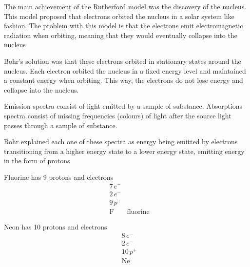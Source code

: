 \begin{solutions}
    \item The main achievement of the Rutherford model was the discovery of the nucleus. This
        model proposed that electrons orbited the nucleus in a solar system like fashion. The
        problem with this model is that the electrons emit electromagnetic radiation when orbiting,
        meaning that they would eventually collapse into the nucleus
    \item Bohr's solution was that these electrons orbited in stationary states around the nucleus.
        Each electron orbited the nucleus in a fixed energy level and maintained a constant
        energy when orbiting. This way, the electrons do not lose energy and collapse into
        the nucleus.
    \item 
        \begin{enum-alph}
            \item Emission spectra consist of light emitted by a sample of substance. Absorptions
                spectra consist of missing frequencies (colours) of light after the source light
                passes through a sample of substance.
            \item Bohr explained each one of these spectra as energy being emitted by electrons 
                transitioning from a higher energy state to a lower energy state, emitting
                energy in the form of protons
        \end{enum-alph}
    \item 
        \begin{enum-alph}
            \item Fluorine has 9 protons and electrons
                \begin{align*}
                    &7\,\si{e^-}\\
                    &2\,\si{e^-}\\
                    &9\,\si{p^+}\\
                    &\text{F}
                    &\text{fluorine}
                \end{align*}
            \item Neon has 10 protons and electrons
                \begin{align*}
                    &8\,\si{e^-}\\
                    &2\,\si{e^-}\\
                    &10\,\si{p^+}\\
                    &\text{Ne}

\end{align*}
\end{enum-alph}
\end{solutions}
